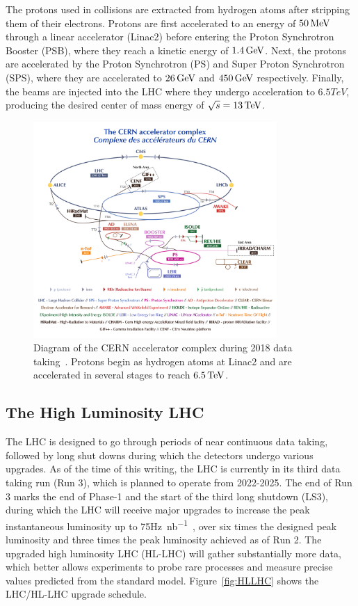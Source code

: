 The protons used in collisions are extracted from hydrogen atoms after stripping them of their electrons. Protons are first accelerated to an energy of $50\,\text{Me\hspace{-.08em}V}$ through a linear accelerator (Linac2) before entering the Proton Synchrotron Booster (PSB), where they reach a kinetic energy of $1.4\,\text{Ge\hspace{-.08em}V}$. Next, the protons are accelerated by the Proton Synchrotron (PS) and Super Proton Synchrotron (SPS), where they are accelerated to $26\,\text{Ge\hspace{-.08em}V}$ and $450\,\text{Ge\hspace{-.08em}V}$ respectively. Finally, the beams are injected into the LHC where they undergo acceleration to $6.5\unit{TeV}$, producing the desired center of mass energy of $\sqrt{s}=13\TeV$.

\begin{figure}[htbp]
	\centering
	\includegraphics[width=0.825\textwidth]{figs/03_experiment/CCC-v2018-print-v2.pdf}
	\caption[Diagram of the CERN accelerator complex during 2018 data taking. Protons begin as hydrogen atoms at Linac2 and collide at various detectors along the LHC at $\sqrt{s}=13\TeV$]
	{Diagram of the CERN accelerator complex during 2018 data taking~\cite{Mobs:2636343}. Protons begin as hydrogen atoms at Linac2 and are accelerated in several stages to reach $6.5\,\text{Te\hspace{-.08em}V}$.} 
	\label{fig:LHC}
\end{figure}

\subsection{The High Luminosity LHC} \label{sec:cms_hllhc}
The LHC is designed to go through periods of near continuous data taking, followed by long shut downs during which the detectors undergo various upgrades. As of the time of this writing, the LHC is currently in its third data taking run (Run 3), which is planned to operate from 2022-2025. The end of Run 3 marks the end of Phase-1 and the start of the third long shutdown (LS3), during which the LHC will receive major upgrades to increase the peak instantaneous luminosity up to 75\unit{\hertz\per nb}~\cite{CERN-LHCC-2020-004}, over six times the designed peak luminosity and three times the peak luminosity achieved as of Run 2. The upgraded high luminosity LHC (HL-LHC) will gather substantially more data, which better allows experiments to probe rare processes and measure precise values predicted from the standard model. Figure~\ref{fig:HLLHC} shows the LHC/HL-LHC upgrade schedule.

